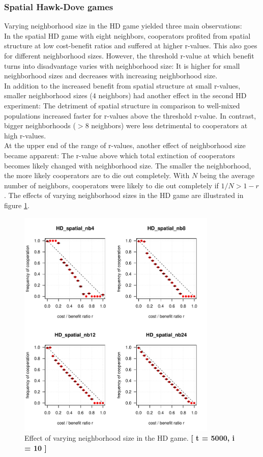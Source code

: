 \subsubsection*{Spatial Hawk-Dove games}
Varying neighborhood size in the HD game yielded three main observations:\\ 
In the spatial HD game with eight neighbors, cooperators profited from spatial structure at low cost-benefit ratios and suffered at higher r-values. This also goes for different neighborhood sizes. However, the threshold r-value at which benefit turns into disadvantage varies with neighborhood size: It is higher for small neighborhood sizes and decreases with increasing neighborhood size.\\
In addition to the increased benefit from spatial structure at small r-values, smaller neighborhood sizes ($4$ neighbors) had another effect in the second HD experiment: The detriment of spatial structure in comparison to well-mixed populations increased faster for r-values above the threshold r-value. In contrast, bigger neighborhoods ($>8$ neighbors) were less detrimental to cooperators at high r-values.\\
At the upper end of the range of r-values, another effect of neighborhood size became apparent: The r-value above which total extinction of cooperators becomes likely changed with neighborhood size. The smaller the neighborhood, the more likely cooperators are to die out completely. With $N$ being the average number of neighbors, cooperators were likely to die out completely if $1 / N > 1 - r$. The effects of varying neighborhood sizes in the HD game are illustrated in figure \ref{fig: task2_4plot}.\\


\begin{figure}[H]
	\centering 
	\includegraphics[width=9.5cm]{task2_4plot}
	\caption{Effect of varying neighborhood size in the HD game.  \textbf{[ t = 5000, i = 10 ]} }\label{fig: task2_4plot}
\end{figure}



